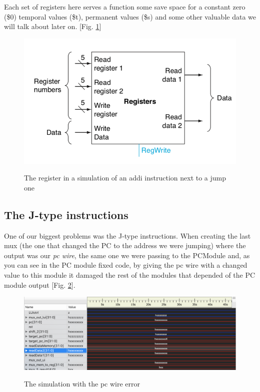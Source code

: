 \documentclass[conference]{IEEEtran}
\begin{document}
    Each set of registers here serves a function some save space for a constant zero (\$0) temporal values (\$t), permanent values (\$s) and some other valuable data we will talk about later on. [Fig. \ref{fig:reg-wave}]
    
    \begin{figure}[h]
        \caption{The register in a simulation of an addi instruction next to a jump one}
        \centering
        \includegraphics[scale=0.30]{images/registers.png}
        \label{fig:reg-wave}
    \end{figure}
    
    \subsection{The J-type instructions}
    One of our biggest problems was the J-type instructions. When creating the last mux (the one that changed the PC to the address we were jumping) where the output was our \textit{pc wire}, the same one we were passing to the PCModule and, as you can see in the PC module fixed code, by giving the pc wire with a changed value to this module it damaged the rest of the modules that depended of the PC module output [Fig. \ref{fig:jump-mux-error}].
    
    \begin{figure}[h]
        \caption{The simulation with the pc wire error}
        \centering
        \includegraphics[scale=0.30]{images/jump_mux_error.png}
        \label{fig:jump-mux-error}
    \end{figure}
    
\end{document}
